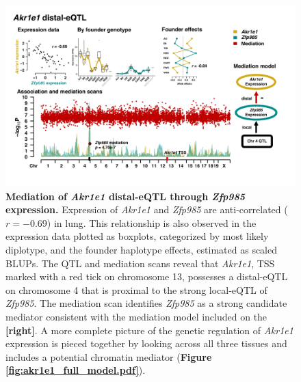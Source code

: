 \documentclass[9pt,twocolumn,twoside]{gsajnl}
\begin{document}
\begin{figure}[hp]
\renewcommand{\familydefault}{\sfdefault}\normalfont
\centering
\includegraphics[width=\textwidth, trim={0in 0.5in 0in 0in}, clip]{figs/akr1e1_mediation.pdf}
\caption{\textbf{Mediation of \textit{Akr1e1} distal-eQTL through \textit{Zfp985} expression.} Expression of \textit{Akr1e1} and \textit{Zfp985} are anti-correlated ($r = -0.69$) in lung. This relationship is also observed in the expression data plotted as boxplots, categorized by most likely diplotype, and the founder haplotype effects, estimated as scaled BLUPs. The QTL and mediation scans reveal that \textit{Akr1e1}, TSS marked with a red tick on chromosome 13, possesses a distal-eQTL on chromosome 4 that is proximal to the strong local-eQTL of \textit{Zfp985}. The mediation scan identifies \textit{Zfp985} as a strong candidate mediator consistent with the mediation model included on the \textbf{[right]}. A more complete picture of the genetic regulation of \textit{Akr1e1} expression is pieced together by looking across all three tissues and includes a potential chromatin mediator (\textbf{Figure \ref{fig:akr1e1_full_model.pdf}}).
\label{fig:akr1e1_exmediation}}
\end{figure}
\end{document}
